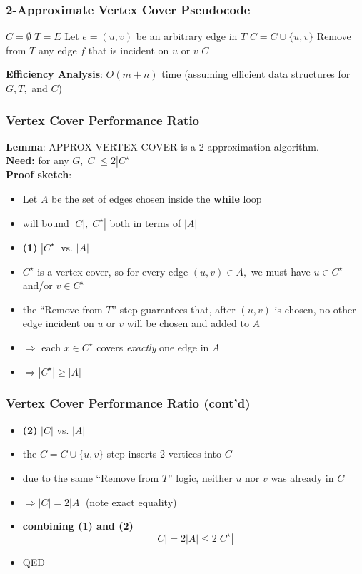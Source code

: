 \documentclass{beamer}
\begin{document}
\begin{frame} \frametitle{2-Approximate Vertex Cover Pseudocode}
  \begin{algorithmic}[1]
      \State $C=\emptyset$
      \State $T=E$ 
        \State Let $e=(u, v)$ be an arbitrary edge in $T$
        \State $C = C \cup \{u, v \}$
        \State Remove from $T$ any edge $f$ that is incident on $u$ or $v$
      \EndWhile
      \State \Return $C$
    \EndFunction
  \end{algorithmic}
\vspace{.5cm}
\textbf{Efficiency Analysis}: $O(m+n)$ time (assuming efficient data structures
for $G, T,$ and $C$)
\end{frame}

\begin{frame} \frametitle{Vertex Cover Performance Ratio}
\textbf{Lemma}: APPROX-VERTEX-COVER is a 2-approximation algorithm. \\
\textbf{Need:} for any $G, |C| \leq 2 |C^\star|$ \\
\textbf{Proof sketch}:
\begin{itemize}
  \item Let $A$ be the set of edges chosen inside the \textbf{while} loop
  \item will bound $|C|, |C^\star|$ both in terms of $|A|$
  \item \textbf{(1)} $|C^\star|$ vs. $|A|$
  \item $C^\star$ is a vertex cover, so for every edge $(u, v) \in A,$ we must have
    $u \in C^\star$ and/or $v \in C^\star$
  \item the ``Remove from $T$'' step guarantees that, after $(u, v)$ is chosen,
    no other edge incident on $u$ or $v$ will be chosen and added to $A$
  \item $\Rightarrow$ each $x \in C^\star$ covers \emph{exactly} one edge in $A$
  \item $\Rightarrow |C^\star| \geq |A|$
\end{itemize}
\end{frame}

\begin{frame} \frametitle{Vertex Cover Performance Ratio (cont'd)}
\begin{itemize}
  \item \textbf{(2)} $|C|$ vs. $|A|$
  \item the $C = C \cup \{u, v \}$ step inserts 2 vertices into $C$
  \item  due to the same ``Remove from $T$'' logic, neither $u$ nor $v$ was already
    in $C$
  \item $\Rightarrow |C| = 2|A|$ (note exact equality)
  \item \textbf{combining (1) and (2)}
  \[ |C| = 2|A| \leq 2|C^\star| \]
  \item QED
\end{itemize}
\end{frame}
\end{document}
